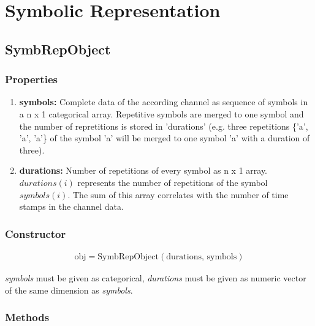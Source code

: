 \documentclass[a4]{scrreprt}
\begin{document}
\section{Symbolic Representation}
\label{ChpSymbolicRepresentation}

\subsection{SymbRepObject}
\label{ChpDescriptionSymbRepObject}

\subsubsection{Properties}

\begin{enumerate}
	\item \textbf{symbols:} Complete data of the according channel as sequence of symbols in a n x 1 categorical array. Repetitive symbols are merged to one symbol and the number of repretitions is stored in 'durations' (e.g. three repetitions \{'a', 'a', 'a'\} of the symbol 'a' will be merged to one symbol 'a' with a duration of three).
	\item \textbf{durations:} Number of repetitions of every symbol as n x 1 array. $durations(i)$ represents the number of repetitions of the symbol $symbols(i)$. The sum of this array correlates with the number of time stamps in the channel data.
\end{enumerate}

\subsubsection{Constructor}

\begin{align*}
\text{obj} = \text{SymbRepObject}(\text{durations, }\text{symbols})
\end{align*}

\textit{symbols} must be given as categorical, \textit{durations} must be given as numeric vector of the same dimension as \textit{symbols}.

\subsubsection{Methods}
\end{document}
